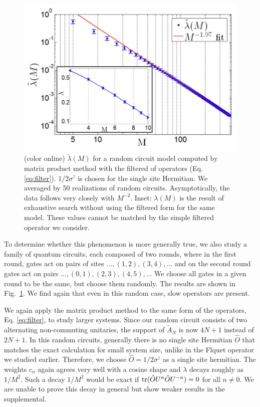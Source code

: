 \documentclass[twocolumn,superscriptaddress, prb]{revtex4-1}
\begin{document}
\begin{figure}
\includegraphics[width=1.0\linewidth]{fig_random_circuit.pdf}
\centering
\caption{ (color online)  $\tilde{\lambda}(M)$ for a random circuit model computed by matrix product method with the filtered of operators (Eq. \eqref{eq:filter}). $1/2\sigma^z$ is chosen for the single site Hermitian. We averaged by 50 realizations of random circuits. Asymptotically, the data follows very closely with $M^{-2}$.
Inset: $\lambda(M)$ is the result of exhaustive search without using the filtered form for the same model.
These values cannot be matched by the simple filtered operator we consider.}
\label{fig:random_circuit}
\end{figure}



To determine whether this phenomenon is more generally true, we also study a family of quantum circuits, each composed of two rounds, where in the first round, gates act on pairs of sites $...,(1,2),(3,4),...$ and on the second round gates act on pairs $...,(0,1),(2,3),(4,5),...$
We choose all gates in a given round to be the same, but choose them randomly.
The results are shown in Fig.~\ref{fig:random_circuit}.
We find again that even in this random case, slow operators are present.

We again apply the matrix product method to the same form of the operators, Eq. \eqref{eq:filter},
to study larger systems. Since our random circuit consists of two alternating non-commuting unitaries,
the support of $\tilde{A}_N$ is now $4N+1$ instead of $2N+1$.
In this random circuits, generally there is no single site Hermitian $\hat{O}$
that matches the exact calculation for small system size, unlike in the Flquet operator we studied earlier.
Therefore, we choose $\hat{O} = 1/2\sigma^z$ as a single site hermitian.
The weights $c_n$ again agrees very well with a cosine shape and $\lambda$ decays roughly as $1/M^2$.
Such a decay $1/M^2$ would be exact if
${\rm tr}(\hat{O} U^n \hat{O} U^{- n})=0$ for all $n \neq 0$.
We are unable to prove this decay in general but show weaker results in the supplemental.
\end{document}
